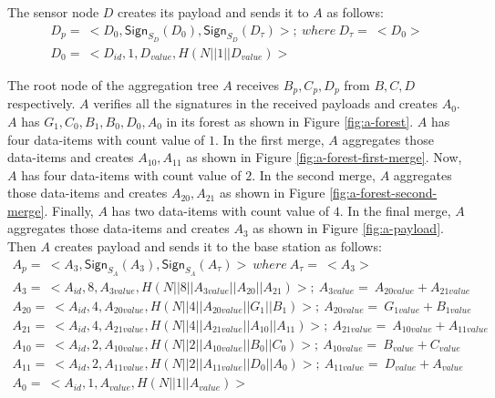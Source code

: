 		The sensor node $D$ creates its payload and sends it to $A$ as follows:
		\begin{equation}
			\begin{array}{l}
				D_{p} =\ <D_{0}, \textsf{Sign}_{S_{D}}(D_{0}), \textsf{Sign}_{S_{D}}(D_{\tau})>;\ where\ D_{\tau} =\ <D_{0}>\\
				D_{0} =\ <D_{id},1,D_{value},H(N||1||D_{value})>
			\end{array}
			\label{eq:d-payload}
		\end{equation}

		The root node of the aggregation tree $A$ receives $B_{p}, C_{p}, D_{p}$
		from $B,C,D$ respectively.
		$A$ verifies all the signatures in the received payloads and creates $A_{0}$.
		$A$ has $G_{1},C_{0},B_{1},B_{0},D_{0},A_{0}$ in its forest as shown in Figure \ref{fig:a-forest}. 
		$A$ has four data-items with count value of $1$.
		In the first merge, $A$ aggregates those data-items and creates $A_{10},A_{11}$ as shown in Figure \ref{fig:a-forest-first-merge}.
		Now, $A$ has four data-items with count value of $2$.
		In the second merge, $A$ aggregates those data-items and creates $A_{20},A_{21}$ as shown in Figure \ref{fig:a-forest-second-merge}.
		Finally, $A$ has two data-items with count value of $4$.
		In the final merge, $A$ aggregates those data-items and creates $A_{3}$ as shown in Figure \ref{fig:a-payload}.
		Then $A$ creates payload and sends it to the base station as follows:
		\begin{equation}
			\begin{array}{l}
				A_{p} =\ <A_{3},\textsf{Sign}_{S_{A}}(A_{3}),\textsf{Sign}_{S_{A}}(A_{\tau})>\ where\ A_{\tau} =\ <A_{3}>\\
				A_{3} =\ <A_{id}, 8, A_{3value}, H(N||8||A_{3value}||A_{20}||A_{21})>;\ A_{3value} =\ A_{20value} + A_{21value}\\
				A_{20} =\ <A_{id},4,A_{20value},H(N||4||A_{20value}||G_{1}||B_{1})>;\ A_{20value} =\ G_{1value} + B_{1value}\\ 
				A_{21} =\ <A_{id},4,A_{21value},H(N||4||A_{21value}||A_{10}||A_{11})>;\ A_{21value} =\ A_{10value} + A_{11value}\\ 
				A_{10} =\ <A_{id},2,A_{10value},H(N||2||A_{10value}||B_{0}||C_{0})>;\ A_{10value} =\ B_{value} + C_{value}\\
				A_{11} =\ <A_{id},2,A_{11value},H(N||2||A_{11value}||D_{0}||A_{0})>;\ A_{11value} =\ D_{value} + A_{value}\\
				A_{0} =\ <A_{id},1,A_{value},H(N||1||A_{value})>
			\end{array}
		\end{equation}
